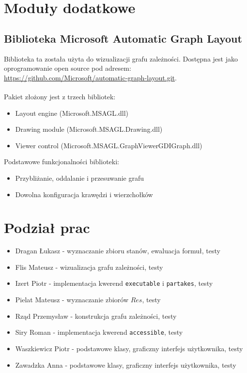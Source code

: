 \documentclass{article}
\begin{document}
\newpage
\section{Moduły dodatkowe}
\subsection{Biblioteka Microsoft Automatic Graph Layout}
Biblioteka ta została użyta do wizualizacji grafu zależności. Dostępna jest jako oprogramowanie open source pod adresem: \\ \url{https://github.com/Microsoft/automatic-graph-layout.git}. \\\\
Pakiet złożony jest z trzech bibliotek:
\begin{itemize}
    \item Layout engine (Microsoft.MSAGL.dll)
    \item Drawing module (Microsoft.MSAGL.Drawing.dll)
    \item Viewer control (Microsoft.MSAGL.GraphViewerGDIGraph.dll)
\end{itemize}
Podstawowe funkcjonalności biblioteki:
\begin{itemize}
    \item Przybliżanie, oddalanie i przesuwanie grafu
    \item Dowolna konfiguracja krawędzi i wierzchołków
\end{itemize}

\newpage
\section{Podział prac}
\begin{itemize}
    \item Dragan Łukasz - wyznaczanie zbioru stanów, ewaluacja formuł, testy
    \item Flis Mateusz - wizualizacja grafu zależności, testy
    \item Izert Piotr - implementacja kwerend \texttt{executable} i \texttt{partakes}, testy
    \item Pielat Mateusz - wyznaczanie zbiorów $Res$, testy
    \item Rząd Przemysław - konstrukcja grafu zależności, testy
    \item Siry Roman - implementacja kwerend \texttt{accessible}, testy 
	\item Waszkiewicz Piotr - podstawowe klasy, graficzny interfejs użytkownika, testy
    \item Zawadzka Anna - podstawowe klasy, graficzny interfejs użytkownika, testy
\end{itemize}
\end{document}

